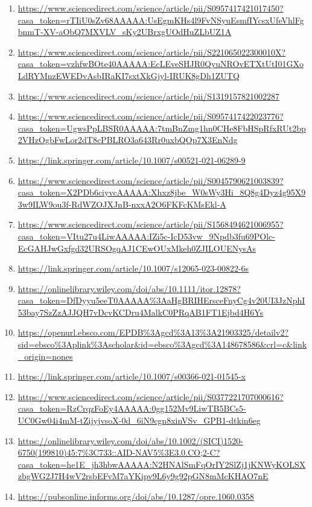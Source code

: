 \documentclass[a4paper,12pt]{article}
\begin{document}
\begin{enumerate}
  \item \url{https://www.sciencedirect.com/science/article/pii/S0957417421017450?casa_token=rTIiU0sZv68AAAAA:UsEgmKHs4l9FvNSyuEsmfIYcsxUfeVhlFgbnmT-XV-aObQ7MXVLV_sKy2UBrxgUOdHuZLbUZ1A}
  \item \url{https://www.sciencedirect.com/science/article/pii/S221065022300010X?casa_token=vzhfwBOte40AAAAA:EcLEveSHJR0QyuNROvETXtUtI01GXoLdRYMnzEWEDvAsbIRaKI7sxtXkGjyl-IRUK8gDh1ZUTQ}
  \item \url{https://www.sciencedirect.com/science/article/pii/S1319157821002287}
  \item \url{https://www.sciencedirect.com/science/article/pii/S0957417422023776?casa_token=UgwsPpLBSR0AAAAA:7tmBnZmg1hn0CHe8FbHSpRfxRUt2bp2VHzOgbFwLor2dT8cPBLRO3a643Rr0uxbQOp7X3EnNdg}
  \item \url{https://link.springer.com/article/10.1007/s00521-021-06289-9}
  \item \url{https://www.sciencedirect.com/science/article/pii/S0045790621003839?casa_token=X2PDb6ciyvcAAAAA:Xhxz8jbe_W0sWy3Hi_8Q8g4Dyz4g95X93w9ILW9ou3f-RdWZOJXJnB-nxxA2O6FKFcKMsEkl-A}
  \item \url{https://www.sciencedirect.com/science/article/pii/S1568494621006955?casa_token=VItu27u4LiwAAAAA:IZi5c-IcD53vw_9Npdb3fu69POlc-EcGAHJwGxfgd32URSOgqAJ1CEwOUxMkeh0ZJILOUENysAs}
  \item \url{https://link.springer.com/article/10.1007/s12065-023-00822-6s}
  \item \url{https://onlinelibrary.wiley.com/doi/abs/10.1111/itor.12878?casa_token=DfDyyu5eeT0AAAAA%3AaHgBRIHErsceFnyCg4v20UI3JzNphI53bay7SzZzAJJQH7vDcvKCDru4MalkC0PRqAB1FT1Ejbd4H6Ys}
  \item \url{https://openurl.ebsco.com/EPDB%3Agcd%3A13%3A21903325/detailv2?sid=ebsco%3Aplink%3Ascholar&id=ebsco%3Agcd%3A148678586&crl=c&link_origin=nones}
  \item \url{https://link.springer.com/article/10.1007/s00366-021-01545-x}
  \item \url{https://www.sciencedirect.com/science/article/pii/S0377221707000616?casa_token=RzCrqzFoEy4AAAAA:0gg152Mv9LiwTB5BCs5-UC0Gw04i4mM-tZijyjvsoX-0d_6iN9cgn8xinVSv_GPB1-dtkin6eg}
  \item \url{https://onlinelibrary.wiley.com/doi/abs/10.1002/(SICI)1520-6750(199810)45:7%3C733::AID-NAV5%3E3.0.CO;2-C?casa_token=he1E_jh3hbwAAAAA:N2HNAlSmFqOrIY2SlZj1jKNWyKOLSXzbgWG2J7H4wV2rsbEFvM7aYKipv9L6y9g92pGN8mMcKHAO7nE}
  \item \url{https://pubsonline.informs.org/doi/abs/10.1287/opre.1060.0358}

\end{enumerate}
\end{document}

